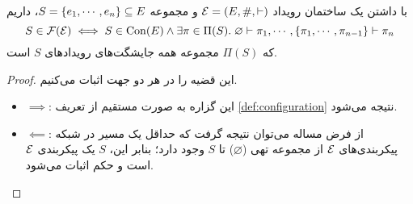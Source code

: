 \begin{theorem}\label{th:conf-equiv}
  با داشتن یک ساختمان رویداد
  $\mathcal{E}=(E,\#,\vdash)$
  و مجموعه
  $S = \left\{ e_1,\cdots,e_n \right\} \subseteq E$،
  داریم
  \begin{equation*}
    S \in \operatorname{\mathcal{F}}(\mathcal{E}) \iff
    S \in \operatorname{Con}(E) \wedge
    \exists \pi \in \Pi(S).\;
    \varnothing \vdash \pi_1, \cdots,
    \left\{ \pi_1,\cdots,\pi_{n-1} \right\} \vdash \pi_n
  \end{equation*}
  که
  $\Pi(S)$
  مجموعه همه جایشگت‌های رویدادهای
  $S$
  است.
\end{theorem}

\begin{proof}
  این قضیه را در هر دو جهت اثبات می‌کنیم.
  \begin{itemize}
    \item $\implies$:
    این گزاره به صورت مستقیم از تعریف
    \ref{def:configuration}
    نتیجه می‌شود.
    \item $\impliedby$:
    از فرض مساله می‌توان نتیجه گرفت که حداقل
    یک مسیر در شبکه پیکربندی‌های
    $\mathcal{E}$
    از مجموعه تهی
    ($\varnothing$)
    تا $S$
    وجود دارد؛ بنابر این،
    $S$
    یک پیکربندی
    $\mathcal{E}$
    است و حکم اثبات می‌شود.
  \end{itemize}
\end{proof}